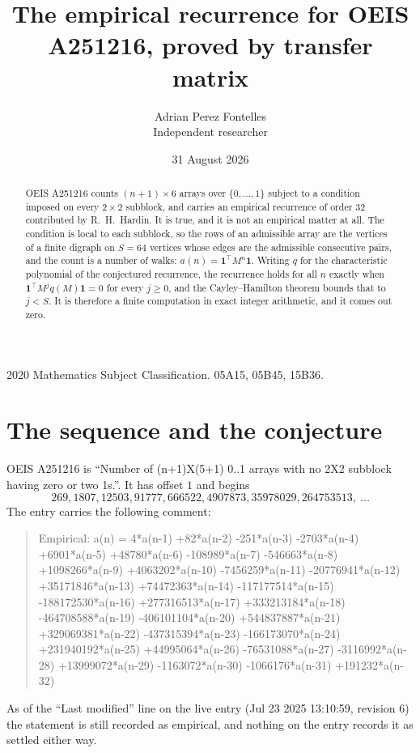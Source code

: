 \documentclass[11pt,a4paper]{article}
\title{The empirical recurrence for OEIS A251216, proved by transfer matrix}
\author{Adrian Perez Fontelles\\ \small Independent researcher}
\date{31 August 2026}
\theoremstyle{plain}
\theoremstyle{definition}
\begin{document}
\maketitle

\begin{abstract}
OEIS A251216 counts $(n+1)\times6$ arrays over $\{0,\dots,1\}$ subject to a condition imposed on
every $2\times2$ subblock, and carries an empirical recurrence of order $32$ contributed
by R.~H.~Hardin. It is true, and it is not an empirical matter at all. The condition is local
to each subblock, so the rows of an admissible array are the vertices of a finite digraph
on $S=64$ vertices whose edges are the admissible consecutive pairs, and the count is a
number of walks: $a(n)=\mathbf{1}^{\!\top}M^{n}\mathbf{1}$. Writing $q$
for the characteristic polynomial of the conjectured recurrence, the recurrence holds for all
$n$ exactly when $\mathbf{1}^{\!\top}M^{j}q(M)\mathbf{1}=0$ for every $j\ge0$, and the
Cayley--Hamilton theorem bounds that to $j<S$. It is therefore a finite computation in exact
integer arithmetic, and it comes out zero.
\end{abstract}

\noindent\small 2020 Mathematics Subject Classification. 05A15, 05B45, 15B36.\normalsize

\section{The sequence and the conjecture}

OEIS A251216 is ``Number of (n+1)X(5+1) 0..1 arrays with no 2X2 subblock having zero or two 1s.''. It has offset $1$ and begins
\[
269, 1807, 12503, 91777, 666522, 4907873, 35978029, 264753513,\ \dots
\]
The entry carries the following comment:
\begin{quote}\small
Empirical: a(n) = 4*a(n-1) +82*a(n-2) -251*a(n-3) -2703*a(n-4) +6901*a(n-5) +48780*a(n-6) -108989*a(n-7) -546663*a(n-8) +1098266*a(n-9) +4063202*a(n-10) -7456259*a(n-11) -20776941*a(n-12) +35171846*a(n-13) +74472363*a(n-14) -117177514*a(n-15) -188172530*a(n-16) +277316513*a(n-17) +333213184*a(n-18) -464708588*a(n-19) -406101104*a(n-20) +544837887*a(n-21) +329069381*a(n-22) -437315394*a(n-23) -166173070*a(n-24) +231940192*a(n-25) +44995064*a(n-26) -76531088*a(n-27) -3116992*a(n-28) +13999072*a(n-29) -1163072*a(n-30) -1066176*a(n-31) +191232*a(n-32)
\end{quote}
As of the ``Last modified'' line on the live entry (Jul 23 2025 13:10:59, revision 6) the statement is
still recorded as empirical, and nothing on the entry records it as settled either way.
\end{document}

